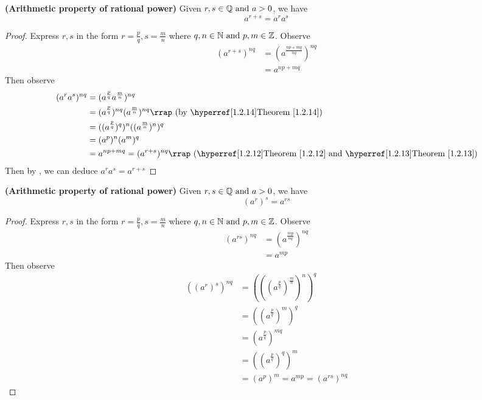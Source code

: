 \documentclass{report}
\begin{document}
\begin{theorem}
\label{1.3.12}
 \textbf{(Arithmetic property of rational power)} Given $r,s\in\mathbb{Q}\text{ and }a>0$, we have
\begin{equation}
a^{r+s}=a^ra^s
\end{equation}
\end{theorem}
\begin{proof}
Express $r,s$ in the form $r=\frac{p}{q},s=\frac{m}{n}$ where $q,n\in\mathbb{N}\text{ and }p,m \in\mathbb{Z}$. Observe
\begin{align}
  (a^{r+s})^{nq}&=(a^{\frac{np+mq}{nq}})^{nq}\\
  &=a^{np+mq} 
\end{align}
Then observe
\begin{align}
  (a^ra^s)^{nq}&= (a^{\frac{p}{q}}a^{\frac{m}{n}})^{nq} \\
  &= (a^{\frac{p}{q}})^{nq}(a^{\frac{m}{n}})^{nq}\rap{by \myref{Theorem}{1.2.14}}\\
  &=((a^{\frac{p}{q}})^q)^n((a^{\frac{m}{n}})^n)^q\\
&=(a^p)^n(a^m)^q\\
&= a^{np+mq}=(a^{r+s})^{nq}\rap{\myref{Theorem}{1.2.12}\text{ and }\myref{Theorem}{1.2.13}} 
\end{align}
Then by , we can deduce $a^ra^s=a^{r+s}$ 
\end{proof}
\begin{theorem}
\label{1.3.13}
\textbf{(Arithmetic property of rational power)} Given $r,s\in\mathbb{Q}\text{ and }a>0$, we have
\begin{equation}
  (a^r)^s=a^{rs}
\end{equation}
\end{theorem}
\begin{proof}
Express $r,s$ in the form $r=\frac{p}{q},s=\frac{m}{n}$ where $q,n\in\mathbb{N}\text{ and }p,m \in\mathbb{Z}$. Observe
\begin{align}
  (a^{rs})^{nq}&=(a^{\frac{mp}{nq}})^{nq}\\
  &= a^{mp}
\end{align}
Then observe
\begin{align}
  ((a^r)^s)^{nq}&=(((a^{\frac{p}{q}})^{\frac{m}{n}})^n)^q\\
  &=((a^{\frac{p}{q}})^m)^q\\
 &=(a^{\frac{p}{q}})^{mq}\\
  &=((a^{\frac{p}{q}})^q)^m \\
  &=(a^p)^m=a^{mp}=(a^{rs})^{nq}  
\end{align}
\end{proof}
\end{document}
